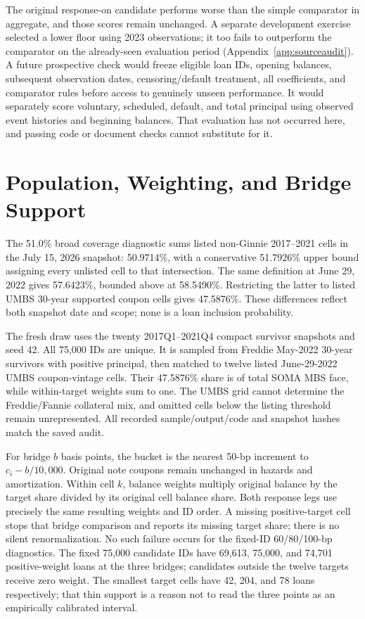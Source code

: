 

The original response-on candidate performs worse than the simple comparator in aggregate, and those scores remain unchanged. A separate development exercise selected a lower floor using 2023 observations; it too fails to outperform the comparator on the already-seen evaluation period (Appendix~\ref{app:sourceaudit}). A future prospective check would freeze eligible loan IDs, opening balances, subsequent observation dates, censoring/default treatment, all coefficients, and comparator rules before access to genuinely unseen performance. It would separately score voluntary, scheduled, default, and total principal using observed event histories and beginning balances. That evaluation has not occurred here, and passing code or document checks cannot substitute for it.

\section{Population, Weighting, and Bridge Support}\label{app:population}

The 51.0\% broad coverage diagnostic sums listed non-Ginnie 2017--2021 cells in the July 15, 2026 snapshot: 50.9714\%, with a conservative 51.7926\% upper bound assigning every unlisted cell to that intersection. The same definition at June 29, 2022 gives 57.6423\%, bounded above at 58.5490\%. Restricting the latter to listed UMBS 30-year supported coupon cells gives 47.5876\%. These differences reflect both snapshot date and scope; none is a loan inclusion probability.

The fresh draw uses the twenty 2017Q1--2021Q4 compact survivor snapshots and seed 42. All 75,000 IDs are unique. It is sampled from Freddie May-2022 30-year survivors with positive principal, then matched to twelve listed June-29-2022 UMBS coupon-vintage cells. Their 47.5876\% share is of total SOMA MBS face, while within-target weights sum to one. The UMBS grid cannot determine the Freddie/Fannie collateral mix, and omitted cells below the listing threshold remain unrepresented. All recorded sample/output/code and snapshot hashes match the saved audit.

For bridge $b$ basis points, the bucket is the nearest 50-bp increment to $c_i-b/10{,}000$. Original note coupons remain unchanged in hazards and amortization. Within cell $k$, balance weights multiply original balance by the target share divided by its original cell balance share. Both response legs use precisely the same resulting weights and ID order. A missing positive-target cell stops that bridge comparison and reports its missing target share; there is no silent renormalization. No such failure occurs for the fixed-ID 60/80/100-bp diagnostics. The fixed 75,000 candidate IDs have 69,613, 75,000, and 74,701 positive-weight loans at the three bridges; candidates outside the twelve targets receive zero weight. The smallest target cells have 42, 204, and 78 loans respectively; that thin support is a reason not to read the three points as an empirically calibrated interval.

